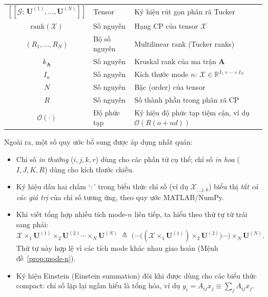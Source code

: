 \begin{table}[H]
\begin{tabular}{clL{7.2cm}}
$[\![\mathcal{G};\,\mathbf{U}^{(1)},\ldots,\mathbf{U}^{(N)}]\!]$ & Tensor & Ký hiệu rút gọn phân rã Tucker \\
\addlinespace
$\mathrm{rank}(\mathcal{X})$ & Số nguyên & Hạng CP của tensor $\mathcal{X}$ \\
$(R_1,\ldots,R_N)$ & Bộ số nguyên & Multilinear rank (Tucker ranks) \\
$k_{\mathbf{A}}$ & Số nguyên & Kruskal rank của ma trận $\mathbf{A}$ \\
\addlinespace
$I_n$ & Số nguyên & Kích thước mode $n$: $\mathcal{X} \in \mathbb{R}^{I_1 \times \cdots \times I_N}$ \\
$N$ & Số nguyên & Bậc (order) của tensor \\
$R$ & Số nguyên & Số thành phần trong phân rã CP \\
$\mathcal{O}(\cdot)$ & Độ phức tạp & Ký hiệu độ phức tạp tiệm cận, ví dụ $\mathcal{O}(R(o+nd))$ \\
\bottomrule
\end{tabular}
\end{table}

Ngoài ra, một số quy ước bổ sung được áp dụng nhất quán:

\begin{itemize}
    \item Chỉ số \textit{in thường} ($i, j, k, r$) dùng cho các phần tử cụ thể; chỉ số \textit{in hoa} ($I, J, K, R$) dùng cho kích thước chiều.
    \item Ký hiệu dấu hai chấm `$:$' trong biểu thức chỉ số (ví dụ $\mathcal{X}_{:,j,k}$) biểu thị \textit{tất cả các giá trị} của chỉ số tương ứng, theo quy ước MATLAB/NumPy.
    \item Khi viết tổng hợp nhiều tích mode-$n$ liên tiếp, ta hiểu theo thứ tự từ trái sang phải:
    \begin{equation}
        \mathcal{X} \times_1 \mathbf{U}^{(1)} \times_2 \mathbf{U}^{(2)} \cdots \times_N \mathbf{U}^{(N)}
        \;\triangleq\;
        \bigl(\cdots\bigl((\mathcal{X} \times_1 \mathbf{U}^{(1)}) \times_2 \mathbf{U}^{(2)}\bigr)\cdots\bigr) \times_N \mathbf{U}^{(N)}.
    \end{equation}
    Thứ tự này hợp lệ vì các tích mode khác nhau giao hoán (Mệnh đề~\ref{prop:mode-n}).
    \item Ký hiệu Einstein (Einstein summation) đôi khi được dùng cho các biểu thức compact: chỉ số lặp lại ngầm hiểu là tổng hóa, ví dụ $y_i = A_{ij} x_j \equiv \sum_j A_{ij} x_j$.
\end{itemize}
